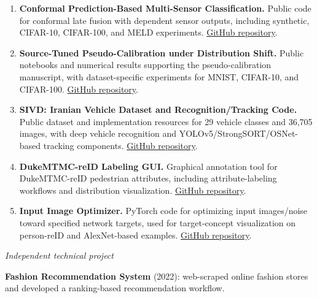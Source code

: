 \documentclass[letterpaper,10pt]{article}
\newcommand{\cvsection}[1]{%
  \Needspace{4\baselineskip}%
  \par\addvspace{11pt}%
  \noindent\marginpar{\vspace{1pt}\RaggedRight\small\scshape #1}%
  \ignorespaces
}
\newcommand{\cvsubsection}[1]{%
  \Needspace{3\baselineskip}%
  \par\addvspace{7pt}\noindent\textit{#1}\par\vspace{3pt}%
}
\begin{document}
\newpage
\cvsection{Research\\Software and\\Datasets}
\begin{enumerate}
  \item \textbf{Conformal Prediction-Based Multi-Sensor Classification.} Public code for conformal late fusion with dependent sensor outputs, including synthetic, CIFAR-10, CIFAR-100, and MELD experiments. \href{https://github.com/Farbod-Siahkali/Conformal-prediction-based-multi-sensor-classification}{GitHub repository}.
  \item \textbf{Source-Tuned Pseudo-Calibration under Distribution Shift.} Public notebooks and numerical results supporting the pseudo-calibration manuscript, with dataset-specific experiments for MNIST, CIFAR-10, and CIFAR-100. \href{https://github.com/Farbod-Siahkali/Source-Tuned-Pseudo-Calibration}{GitHub repository}.
  \item \textbf{SIVD: Iranian Vehicle Dataset and Recognition/Tracking Code.} Public dataset and implementation resources for 29 vehicle classes and 36,705 images, with deep vehicle recognition and YOLOv5/StrongSORT/OSNet-based tracking components. \href{https://github.com/Farbod-Siahkali/Iranian-Vehicle-Tracking-and-Recognition}{GitHub repository}.
  \item \textbf{DukeMTMC-reID Labeling GUI.} Graphical annotation tool for DukeMTMC-reID pedestrian attributes, including attribute-labeling workflows and distribution visualization. \href{https://github.com/Farbod-Siahkali/Labeling-GUI-DukeMTMC-ReID}{GitHub repository}.
  \item \textbf{Input Image Optimizer.} PyTorch code for optimizing input images/noise toward specified network targets, used for target-concept visualization on person-reID and AlexNet-based examples. \href{https://github.com/Farbod-Siahkali/Input-Image-Optimizer}{GitHub repository}.
\end{enumerate}

\cvsection{Additional\\Projects and\\Coursework}
\cvsubsection{Independent technical project}
\textbf{Fashion Recommendation System} (2022): web-scraped online fashion stores and developed a ranking-based recommendation workflow.
\end{document}
